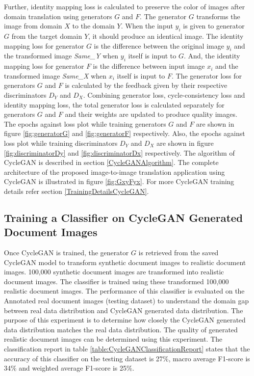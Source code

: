 Further, identity mapping loss is calculated to preserve the color of images after domain translation using generators $G$ and $F$. The generator $G$ transforms the image from domain $X$ to the domain $Y$. When the input $y_i$ is given to generator $G$ from the target domain $Y$, it should produce an identical image. The identity mapping loss for generator $G$ is the difference between the original image $y_i$ and the transformed image \textit{Same\_Y} when $y_i$ itself is input to $G$. And, the identity mapping loss for generator $F$ is the difference between input image $x_i$ and the transformed image \textit{Same\_X} when $x_i$ itself is input to $F$. The generator loss for generators $G$ and $F$ is calculated by the feedback given by their respective discriminators $D_Y$ and $D_X$. Combining generator loss, cycle-consistency loss and identity mapping loss, the total generator loss is calculated separately for generators $G$ and $F$ and their weights are updated to produce quality images. The epochs against loss plot while training generators $G$ and $F$ are shown in figure \ref{fig:generatorG} and \ref{fig:generatorF} respectively. Also, the epochs against loss plot while training discriminators $D_Y$ and $D_X$ are shown in figure \ref{fig:discriminatorDy} and \ref{fig:discriminatorDx} respectively. The algorithm of \ac{CycleGAN} is described in section \ref{CycleGANAlgorithm}. The complete architecture of the proposed image-to-image translation application using \ac{CycleGAN} is illustrated in figure \ref{fig:GxyFyx}. For more \ac{CycleGAN} training details refer section \ref{TrainingDetailsCycleGAN}. 




\subsection{Training a Classifier on \ac{CycleGAN} Generated Document Images}\label{trainingCycleGANDataClassifier}


Once \ac{CycleGAN} is trained, the generator $G$ is retrieved from the saved \ac{CycleGAN} model to transform synthetic document images to realistic document images. 100,000 synthetic document images are transformed into realistic document images. The classifier is trained using these transformed 100,000 realistic document images. The performance of this classifier is evaluated on the Annotated real document images (testing dataset) to understand the domain gap between real data distribution and \ac{CycleGAN} generated data distribution. The purpose of this experiment is to determine how closely the \ac{CycleGAN} generated data distribution matches the real data distribution. The quality of generated realistic document images can be determined using this experiment. The classification report in table \ref{table:CycleGANClassificationReport} states that the accuracy of this classifier on the testing dataset is 27\%, macro average F1-score is 34\% and weighted average F1-score is 25\%. 

